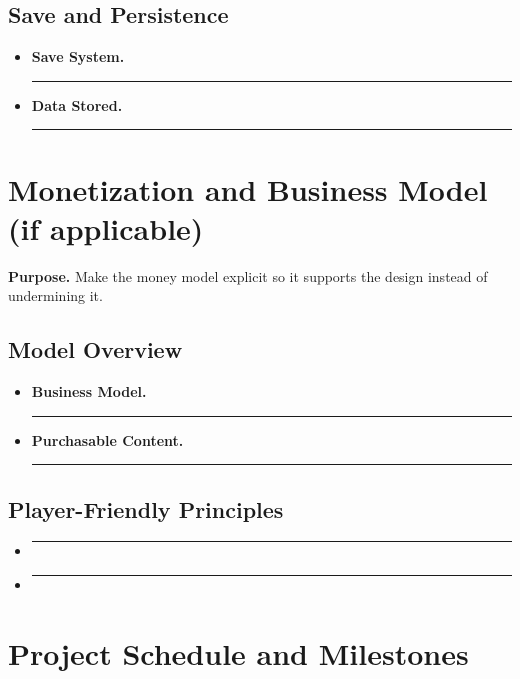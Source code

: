 \documentclass[12pt]{article}
\newcommand{\placeholder}[1]{\rule[-0.4em]{0pt}{2em}\rule{0.62\linewidth}{0.4pt}}
\begin{document}
\subsection{Save and Persistence}

\begin{itemize}
    \item \textbf{Save System.} \placeholder{Manual saves, autosave, checkpoints, cloud saves.}
    \item \textbf{Data Stored.} \placeholder{Player progress, inventory, options, statistics, etc.}
\end{itemize}

\section{Monetization and Business Model (if applicable)}

\textbf{Purpose.} Make the money model explicit so it supports the design instead of undermining it.

\subsection{Model Overview}

\begin{itemize}
    \item \textbf{Business Model.} \placeholder{Premium, free-to-play, subscription, DLC-based, etc.}
    \item \textbf{Purchasable Content.} \placeholder{Cosmetics, expansions, boosts, battle passes, etc.}
\end{itemize}

\subsection{Player-Friendly Principles}

\begin{itemize}
    \item \placeholder{How you avoid pay-to-win, exploitative systems, or aggressive friction.}
    \item \placeholder{How purchases feel optional, rewarding, and fair.}
\end{itemize}

\section{Project Schedule and Milestones}
\end{document}
